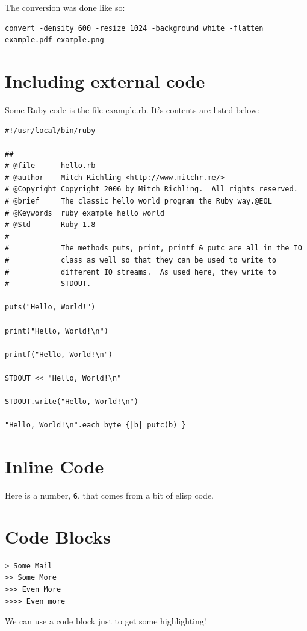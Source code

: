 \documentclass[11pt]{article}
\begin{document}
The conversion was done like so:

\begin{verbatim}
convert -density 600 -resize 1024 -background white -flatten example.pdf example.png
\end{verbatim}

\section{Including external code}
\label{sec-4}

Some Ruby code is the file \url{example.rb}.  It's contents are listed below:

\begin{verbatim}
#!/usr/local/bin/ruby

##
# @file      hello.rb
# @author    Mitch Richling <http://www.mitchr.me/>
# @Copyright Copyright 2006 by Mitch Richling.  All rights reserved.
# @brief     The classic hello world program the Ruby way.@EOL
# @Keywords  ruby example hello world
# @Std       Ruby 1.8
#
#            The methods puts, print, printf & putc are all in the IO
#            class as well so that they can be used to write to
#            different IO streams.  As used here, they write to
#            STDOUT.

puts("Hello, World!")

print("Hello, World!\n")

printf("Hello, World!\n")

STDOUT << "Hello, World!\n"

STDOUT.write("Hello, World!\n")

"Hello, World!\n".each_byte {|b| putc(b) }
\end{verbatim}

\section{Inline Code}
\label{sec-5}

Here is a number, \texttt{6}, that comes from a bit of elisp code.

\section{Code Blocks}
\label{sec-6}

\begin{verbatim}
> Some Mail
>> Some More
>>> Even More
>>>> Even more
\end{verbatim}

We can use a code block just to get some highlighting!
\end{document}
